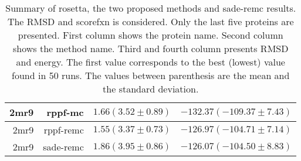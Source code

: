 \begin{table}[ht]
\begin{tabular}{r|r|c|c}
    2mr9 &            rppf-mc & $1.66 (  3.52 \pm   0.89)$ & $-132.37 (-109.37 \pm   7.43)$ \\ \hline
    2mr9 &          rppf-remc & $1.55 (  3.37 \pm   0.73)$ & $-126.97 (-104.71 \pm   7.14)$ \\ \hline
    2mr9 &          sade-remc & $1.86 (  3.95 \pm   0.86)$ & $-126.07 (-104.50 \pm   8.83)$ \\ \hline
    \end{tabular}
    \caption{Summary of rosetta, the two proposed methods and sade-remc results.
    The RMSD and scorefxn is considered. Only the last five proteins are presented.
    First column shows the protein name. Second column shows the method name.
    Third and fourth column presents RMSD and energy. The first value corresponds
    to the best (lowest) value found in 50 runs. The values between parenthesis are
    the mean and the standard deviation.}
    \label{tab:results-second-half}
\end{table}